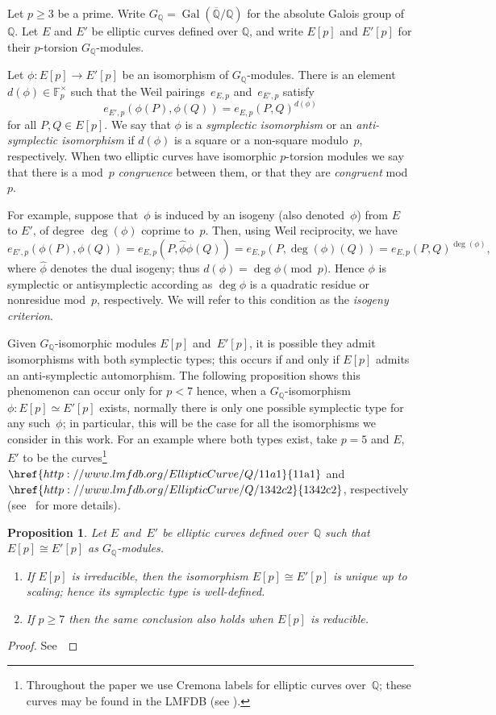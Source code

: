 \documentclass[12pt, reqno]{amsart}
\newcommand{\lmfdbec}[3]{\href{http://www.lmfdb.org/EllipticCurve/Q/#1#2#3}{{\text{\rm#1#2#3}}}}
\newcommand{\F}{\mathbb{F}}
\newcommand{\Q}{\mathbb{Q}}
\newcommand{\Qbar}{{\overline{\Q}}}
\DeclareMathOperator{\Gal}{Gal}
\numberwithin{equation}{section}
\newtheorem{proposition}[theorem]{Proposition}
\theoremstyle{definition}
\theoremstyle{remark}
\begin{document}
Let $p \geq 3$ be a prime. Write $G_\Q = \Gal(\Qbar/\Q)$ for the
absolute Galois group of $\Q$.  Let $E$ and $E'$ be elliptic curves defined over $\Q$, and write $E[p]$ and $E'[p]$ for their $p$-torsion $G_\Q$-modules.

Let $\phi : E[p] \to E'[p]$ be an isomorphism of $G_\Q$-modules.
There is an element $d(\phi) \in \F_p^\times$ such that the Weil 
pairings~$e_{E,p}$ and~$e_{E',p}$ satisfy
\[
e_{E',p}(\phi(P), \phi(Q)) = e_{E,p}(P, Q)^{d(\phi)}
\]
for all $P, Q \in E[p]$.  We say that $\phi$ is a {\em symplectic
  isomorphism} or an {\em anti-symplectic isomorphism} if $d(\phi)$ is
a square or a non-square modulo~$p$, respectively.  When two elliptic
curves have isomorphic $p$-torsion modules we say that there is a
mod~$p$ {\em congruence} between them, or that they are {\em
  congruent} mod~$p$.

For example, suppose that~$\phi$ is induced by an isogeny (also
denoted~$\phi$) from $E$ to $E'$, of degree $\deg(\phi)$ coprime
to~$p$. Then, using Weil reciprocity, 
we have 
\[
  e_{E',p}(\phi(P), \phi(Q)) = e_{E,p}(P, \hat\phi\phi(Q)) =
  e_{E,p}(P, \deg(\phi)(Q)) = e_{E,p}(P, Q)^{\deg(\phi)},
  \]
  where $\hat{\phi}$ denotes the dual isogeny; 
  thus $d(\phi)=\deg\phi\pmod{p}$.
  Hence $\phi$ is symplectic or antisymplectic according as $\deg\phi$
is a quadratic residue or nonresidue mod~$p$, respectively.  We will refer to
this condition as the \emph{isogeny criterion}.

Given $G_\Q$-isomorphic modules $E[p]$ and~$E'[p]$, it is possible
they admit isomorphisms with both symplectic types; this occurs if and only if $E[p]$ admits an anti-symplectic automorphism. 
The following proposition shows this phenomenon can occur only 
for $p < 7$ hence, when a $G_\Q$-isomorphism $\phi : E[p] \simeq E'[p]$ exists, normally there is only one possible symplectic type for any such~$\phi$; in particular, this will be the case for all the isomorphisms we consider in this work. 
For an example where both types exist, take $p=5$ and
$E$, $E'$ to be the curves\footnote{Throughout the paper we use
Cremona labels for elliptic curves over~$\Q$; these curves may be
found in the LMFDB (see \cite{lmfdb}).} $\lmfdbec{11}{a}{1}$ and
$\lmfdbec{1342}{c}{2}$, respectively (see~\cite[Example~5.2]{FKSym}
for more details).

\begin{proposition}\label{P:auto}
  Let $E$ and~$E'$ be elliptic curves defined over~$\Q$ such that
  $E[p]\cong E'[p]$ as $G_\Q$-modules.
  \begin{enumerate}
    \item If $E[p]$ is irreducible, then the isomorphism $E[p]\cong
      E'[p]$ is unique up to scaling; hence its symplectic type is
      well-defined.
      \item If $p\ge7$ then the same conclusion also holds when
        $E[p]$ is reducible.
  \end{enumerate}
\end{proposition}
\begin{proof} See~\cite[Corollary~3 and Proposition~2]{FKSym}
\end{proof}
\end{document}
